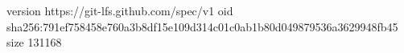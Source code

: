 version https://git-lfs.github.com/spec/v1
oid sha256:791ef758458e760a3b8df15e109d314c01c0ab1b80d049879536a3629948fb45
size 131168
